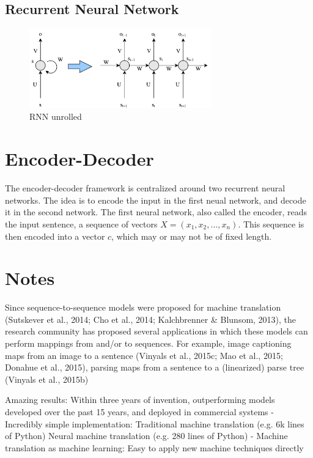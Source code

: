 \subsection{Recurrent Neural Network}
\begin{figure}[ht]
    \centering
    \includegraphics[width=0.7\textwidth]{fig/related_work/nn_recurrent.pdf}
    \caption{RNN unrolled}
    \label{fig:nn-rnn}
\end{figure}


\section{Encoder-Decoder}
\label{sec:encoder-decoder}

The encoder-decoder framework is centralized around two recurrent neural networks. The idea is to encode the input in the first neual network, and decode it in the second network. The first neural network, also called the encoder, reads the input sentence, a sequence of vectors \(X = (x_{1}, x_{2}, ..., x_{n})\). This sequence is then encoded into a vector \(c\), which may or may not be of fixed length.

\iffalse
\section{Notes}


Since sequence-to-sequence models were proposed for machine translation (Sutskever et al., 2014; Cho et al., 2014; Kalchbrenner & Blunsom, 2013), the research community has proposed several applications in which these models can perform mappings from and/or to sequences. For example, image captioning maps from an image to a sentence (Vinyals et al., 2015c; Mao et al., 2015; Donahue et al., 2015), parsing maps from a sentence to a (linearized) parse tree (Vinyals et al., 2015b)

Amazing results:
Within three years of invention, outperforming models
developed over the past 15 years, and deployed in
commercial systems
- Incredibly simple implementation:
Traditional machine translation (e.g. 6k lines of Python)
Neural machine translation (e.g. 280 lines of Python)
- Machine translation as machine learning:
Easy to apply new machine techniques directly

